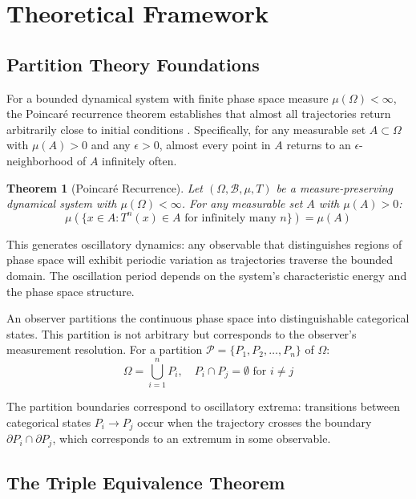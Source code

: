 \documentclass[twocolumn,10pt]{article}
\newtheorem{theorem}{Theorem}[section]
\theoremstyle{remark}
\begin{document}
\section{Theoretical Framework}

\subsection{Partition Theory Foundations}

For a bounded dynamical system with finite phase space measure $\mu(\Omega) < \infty$, the Poincar\'e recurrence theorem establishes that almost all trajectories return arbitrarily close to initial conditions \citep{poincare1890probleme}. Specifically, for any measurable set $A \subset \Omega$ with $\mu(A) > 0$ and any $\epsilon > 0$, almost every point in $A$ returns to an $\epsilon$-neighborhood of $A$ infinitely often.

\begin{theorem}[Poincar\'e Recurrence]
Let $(\Omega, \mathcal{B}, \mu, T)$ be a measure-preserving dynamical system with $\mu(\Omega) < \infty$. For any measurable set $A$ with $\mu(A) > 0$:
\begin{equation}
\mu\left(\{x \in A : T^n(x) \in A \text{ for infinitely many } n\}\right) = \mu(A)
\end{equation}
\end{theorem}

This generates oscillatory dynamics: any observable that distinguishes regions of phase space will exhibit periodic variation as trajectories traverse the bounded domain. The oscillation period depends on the system's characteristic energy and the phase space structure.

An observer partitions the continuous phase space into distinguishable categorical states. This partition is not arbitrary but corresponds to the observer's measurement resolution. For a partition $\mathcal{P} = \{P_1, P_2, \ldots, P_n\}$ of $\Omega$:
\begin{equation}
\Omega = \bigcup_{i=1}^n P_i, \quad P_i \cap P_j = \emptyset \text{ for } i \neq j
\end{equation}

The partition boundaries correspond to oscillatory extrema: transitions between categorical states $P_i \to P_j$ occur when the trajectory crosses the boundary $\partial P_i \cap \partial P_j$, which corresponds to an extremum in some observable.

\subsection{The Triple Equivalence Theorem}
\end{document}
